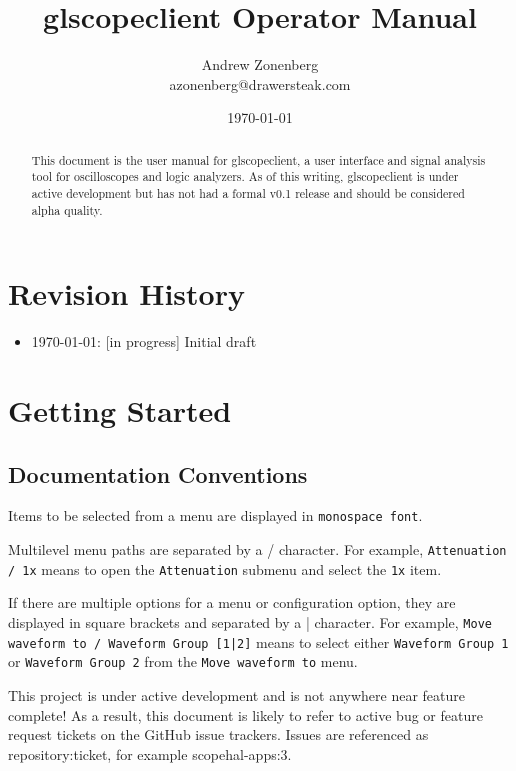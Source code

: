 \documentclass[11pt]{article}
\newcommand{\menustyle}[1]{\texttt{#1}}
\begin{document}
\title{glscopeclient Operator Manual}
\author{Andrew Zonenberg\\
azonenberg@drawersteak.com}
\date{\today}

\maketitle
\begin{abstract} \normalsize
This document is the user manual for glscopeclient, a user interface and signal analysis tool for oscilloscopes and
logic analyzers. As of this writing, glscopeclient is under active development but has not had a formal v0.1 release
and should be considered alpha quality.
\end{abstract}
\thispagestyle{empty}

\pagebreak

\tableofcontents

\pagebreak
\section{Revision History}
\begin{itemize}
\item \today: [in progress] Initial draft
\end{itemize}

\pagebreak
\section{Getting Started}

\subsection{Documentation Conventions}

Items to be selected from a menu are displayed in \menustyle{monospace font}.

Multilevel menu paths are separated by a / character. For example, \menustyle{Attenuation / 1x} means to open the
\menustyle{Attenuation} submenu and select the \menustyle{1x} item.

If there are multiple options for a menu or configuration option, they are displayed in square brackets and separated
by a | character. For example, \menustyle{Move waveform to / Waveform Group [1|2]} means to select either
\menustyle{Waveform Group 1} or \menustyle{Waveform Group 2} from the \menustyle{Move waveform to}
menu.

This project is under active development and is not anywhere near feature complete! As a result, this document is
likely to refer to active bug or feature request tickets on the GitHub issue trackers. Issues are referenced as
repository:ticket, for example scopehal-apps:3.
\end{document}
